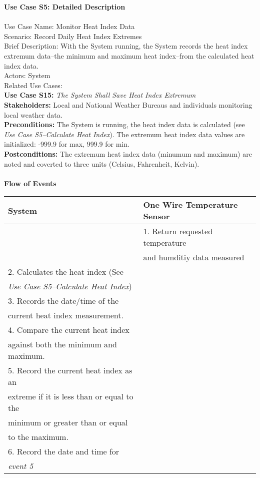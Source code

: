 \documentclass[letterpaper]{article}
\begin{document}
\noindent
\textbf{Use Case S5:  Detailed Description}\\\\
Use Case Name:  Monitor Heat Index Data\\
Scenario:  Record  Daily Heat Index  Extremes\\
Brief Description:  With the System running, the System records the
heat index extremum data--the minimum and maximum heat index--from the
calculated heat index data.\\
Actors:  System\\
Related Use Cases:\\
\textbf{Use Case S15:  }\emph{The System Shall Save Heat Index
Extremum}\\
\textbf{Stakeholders:  }Local and National Weather Bureaus and
individuals monitoring local weather data.\\
\textbf{Preconditions:  }The System is running, the heat index
data is calculated (see \emph{Use Case S5--Calculate Heat Index}). The
extremum heat index data values are initialized: -999.9 for max, 999.9
for min.\\
\textbf{Postconditions:  }The extremum heat index data (minumum
and maximum) are  noted and coverted to three units (Celsius,
Fahrenheit, Kelvin).\\\\
\textbf{Flow of Events}\\
\begin{tabular}{|l|l|}\hline
\textbf{System} & \textbf{One Wire Temperature Sensor}\\\hline
& 1.  Return requested temperature\\ 
&      and humditiy data  measured\\\hline
2.     Calculates the heat index (See & \\
 \emph{Use Case S5--Calculate Heat Index}) & \\\hline
3.     Records the date/time of the & \\
current heat index measurement. & \\\hline
4.     Compare the current heat index & \\
against both the minimum and maximum. &\\\hline
5.     Record the current heat index as an &\\
extreme if it is less than or equal to the &\\
minimum or greater than or equal &\\
to the maximum. & \\\hline
6.    Record the date and time for & \\
\emph{event 5} & \\\hline
\end{tabular}\\\\
\end{document}
